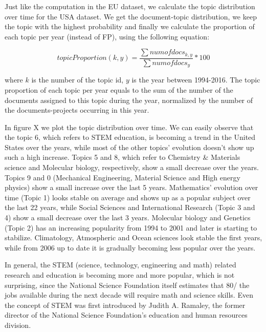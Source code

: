 \documentclass[12pt]{report}
\begin{document}
Just like the computation in the EU dataset, we calculate the topic 
distribution over time for the USA dataset. We get the document-topic 
distribution, we keep the topic with the highest probability and finally 
we calculate the proportion of each topic per
year (instead of FP), using the following equation:

\begin{equation}
topicProportion(k, y) = \frac{\sum num of docs_{k,y}}{\sum num of docs_{y}} * 100
\end{equation}

where $k$ is the number of the topic id, $y$ is the year between 1994-2016. The
topic proportion of each topic per year equals to the sum of the number of the
documents assigned to this topic during the year, normalized by the number of
the documents-projects  occurring in this year.

In figure X we plot the topic distribution over time. We can easily observe that
the topic 6, which refers to STEM education, is becoming a trend in the United
States over the years, while most of the other topics' evolution doesn't show up
such a high increase. Topics 5 and 8, which refer to Chemistry \& Materials
science and Molecular biology, respectively, show a small decrease over the
years. Topics 9 and 0 (Mechanical Engineering, Material Science and High energy
physics) show a small increase over the last 5 years. Mathematics' evolution
over time (Topic 1) looks stable on average and shows up as a popular subject
over the last 22 years, while Social Sciences and International Research (Topic
3 and 4) show a small decrease over the last 3 years.  Molecular biology and
Genetics (Topic 2) has an increasing popularity from 1994 to 2001 and later is
starting to stabilize. Climatology, Atmospheric and Ocean sciences look stable
the first years, while from 2006 up to date it is gradually becoming less
popular over the years.

In general, the STEM (science, technology, engineering and math) related
research and education is becoming more and more popular, which is not
surprising, since the National Science Foundation itself estimates that 80/%
the jobs available during the next decade will require math and science skills.
Even the concept of STEM was first introduced by Judith A. Ramaley, the former
director of the National Science Foundation’s education and human resources
division.
\end{document}
